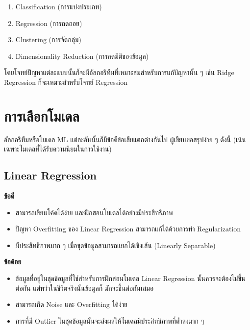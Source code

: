 \begin{enumerate}
    \item Classification (การแบ่งประเภท)
    
    \item Regression (การถดถอย)
    
    \item Clustering (การจัดกลุ่ม)
    
    \item Dimensionality Reduction (การลดมิติของข้อมูล)
\end{enumerate}

โดยโจทย์ปัญหาแต่ละแบบนั้นก็จะมีอัลกอริทึมที่เหมาะสมสำหรับการแก้ปัญหานั้น ๆ เช่น Ridge Regression ก็จะเหมาะสำหรับโจทย์ Regression

\section{การเลือกโมเดล}
\label{sec:choose_model}

อัลกอริทึมหรือโมเดล ML แต่ละอันนั้นก็มีข้อดีข้อเสียแตกต่างกันไป ผู้เขียนขอสรุปง่าย ๆ ดังนี้ (เน้นเฉพาะโมเดลที่ได้รับความนิยมในการใช้งาน)

\subsection{Linear Regression}
\label{ssec:pros_cons_lin_reg}

\noindent \textbf{ข้อดี}
\begin{itemize}[topsep=0pt]
    \item สามารถเขียนโค้ดได้ง่าย และฝึกสอนโมเดลได้อย่างมีประสิทธิภาพ
    
    \item ปัญหา Overfitting ของ Linear Regression สามารถแก้ได้ด้วยการทำ Regularization
    
    \item มีประสิทธิภาพมาก ๆ เมื่อชุดข้อมูลสามารถแยกได้เชิงเส้น (Linearly Separable)
\end{itemize}

\noindent \textbf{ข้อด้อย}
\begin{itemize}[topsep=0pt]
    \item ข้อมูลที่อยู่ในชุดข้อมูลที่ใช่สำหรับการฝึกสอนโมเดล Linear Regression นั้นควรจะต้องไม่ขึ้นต่อกัน แต่ทว่าในชีวิตจริงนั้นข้อมูลก็%
    มักจะขึ้นต่อกันเสมอ

    \item สามารถเกิด Noise และ Overfitting ได้ง่าย
    
    \item การที่มี Outlier ในชุดข้อมูลนั้นจะส่งผลให้โมเดลมีประสิทธิภาพที่ต่ำลงมาก ๆ
\end{itemize}

